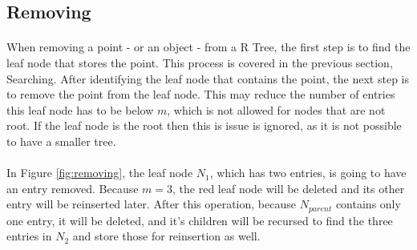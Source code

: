\documentclass{article}
\begin{document}
\begin{multicols}{2}[]
\section{Removing}

\paragraph{}
When removing a point - or an object - from a R Tree, the first step is to find the leaf node that stores the point.
This process is covered in the previous section, Searching. After identifying the leaf node that contains
the point, the next step is to remove the point from the leaf node. This may reduce the number of entries this leaf node has to be below
$m$, which is not allowed for nodes that are not root. If the leaf node is the root then this is issue is ignored, as it is not possible to have a smaller tree.\\

\begin{minipage}{\linewidth}
\centering
{}
\label{fig:removing}
\end{minipage}

\paragraph{}
In Figure \ref{fig:removing}, the leaf node $N_1$, which has two entries, is going to have an entry removed.
 Because $m=3$, the red leaf node will be deleted and its other entry will be reinserted later. After this operation, because $N_{parent}$
 contains only one entry, it will be deleted, and it's children will be recursed to find the three entries in $N_2$ and store those for reinsertion as well.

\end{multicols}
\end{document}
